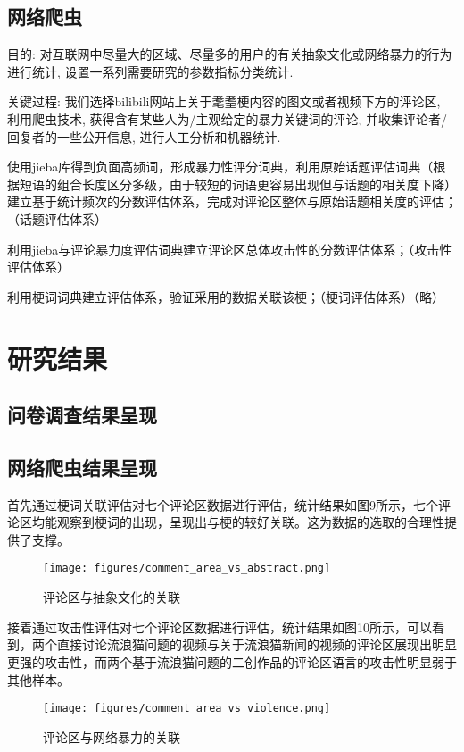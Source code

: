 \documentclass[12pt,a4paper]{ctexart}
\begin{document}
\subsection{网络爬虫}
目的: 对互联网中尽量大的区域、尽量多的用户的有关抽象文化或网络暴力的行为进行统计, 设置一系列需要研究的参数指标分类统计.

关键过程: 我们选择bilibili网站上关于耄耋梗内容的图文或者视频下方的评论区, 利用爬虫技术, 获得含有某些人为/主观给定的暴力关键词的评论, 并收集评论者/回复者的一些公开信息, 进行人工分析和机器统计.

使用jieba库得到负面高频词，形成暴力性评分词典，利用原始话题评估词典（根据短语的组合长度区分多级，由于较短的词语更容易出现但与话题的相关度下降）建立基于统计频次的分数评估体系，完成对评论区整体与原始话题相关度的评估；（话题评估体系）

利用jieba与评论暴力度评估词典建立评论区总体攻击性的分数评估体系；（攻击性评估体系）

利用梗词词典建立评估体系，验证采用的数据关联该梗；（梗词评估体系）（略）


\section{研究结果}

\subsection{问卷调查结果呈现}

\subsection{网络爬虫结果呈现}
首先通过梗词关联评估对七个评论区数据进行评估，统计结果如图9所示，七个评论区均能观察到梗词的出现，呈现出与梗的较好关联。这为数据的选取的合理性提供了支撑。

\begin{figure}[htbp]
    \centering
    \texttt{[image: figures/comment\_area\_vs\_abstract.png]}
    \caption{评论区与抽象文化的关联}
    \label{fig:comment_area_vs_abstract}
\end{figure}

接着通过攻击性评估对七个评论区数据进行评估，统计结果如图10所示，可以看到，两个直接讨论流浪猫问题的视频与关于流浪猫新闻的视频的评论区展现出明显更强的攻击性，而两个基于流浪猫问题的二创作品的评论区语言的攻击性明显弱于其他样本。

\begin{figure}[htbp]
    \centering
    \texttt{[image: figures/comment\_area\_vs\_violence.png]}
    \caption{评论区与网络暴力的关联}
    \label{fig:comment_area_vs_violence}
\end{figure}
\end{document}
